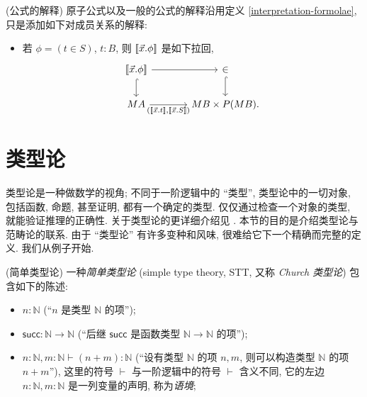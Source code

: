 \begin{definition}
	{(公式的解释)}
	原子公式以及一般的公式的解释沿用定义 \ref{interpretation-formolae}, 只是添加如下对成员关系的解释:
	\begin{itemize}
		\item 若 $\phi = (t\in S)$, $t\colon B$, 则 ${[\![\vec x.\phi]\!]}$ 是如下拉回,
		\[\begin{tikzcd}[ampersand replacement=\&,column sep=large]
			{\interpretation{\vec x.\phi}} \& \in \\
			MA \& {MB\times P(MB).}
			\arrow[hook, from=1-2, to=2-2]
			\arrow["{(\interpretation{\vec x.t},\interpretation{\vec x.S})}"', from=2-1, to=2-2]
			\arrow[hook, from=1-1, to=2-1]
			\arrow[from=1-1, to=1-2]
		\end{tikzcd}\]
	\end{itemize}
\end{definition}

\section{类型论}

\label{appendix-type-theory}


类型论是一种做数学的视角; 不同于一阶逻辑中的 ``类型'', 类型论中的一切对象, 包括函数, 命题, 甚至证明, 都有一个确定的类型. 仅仅通过检查一个对象的类型, 就能验证推理的正确性. 关于类型论的更详细介绍见 \cite{Trebor-History}. 本节的目的是介绍类型论与范畴论的联系.
由于 ``类型论'' 有许多变种和风味, 很难给它下一个精确而完整的定义. 我们从例子开始.

\begin{example}
	{(简单类型论)}
	一种\emph{简单类型论} (simple type theory, STT, 又称 \emph{Church 类型论}) 包含如下的陈述:
	\begin{itemize}
		\item $n\colon \mathbb{N}$ (``$n$ 是类型 $\mathbb{N}$ 的项'');
		\item $\mathsf {succ}\colon \mathbb{N}\to\mathbb{N}$ (``后继 $\mathsf {succ}$ 是函数类型 $\mathbb{N}\to\mathbb{N}$ 的项'');
		\item $n\colon \mathbb{N},m\colon \mathbb{N} \vdash (n+m) \colon \mathbb{N}$ (``设有类型 $\mathbb{N}$ 的项 $n,m$, 则可以构造类型 $\mathbb{N}$ 的项 $n+m$''), 这里的符号 $\vdash$ 与一阶逻辑中的符号 $\vdash$ 含义不同, 它的左边 $n\colon \mathbb{N},m\colon \mathbb{N}$ 是一列变量的声明, 称为\emph{语境};
	\end{itemize}
	
\end{example}

